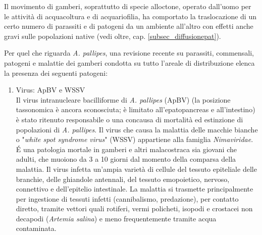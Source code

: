 \documentclass[11pt,a4paper,italian,twoside,openany]{memoir}
\begin{document}
Il movimento di gamberi, soprattutto di specie alloctone, operato dall'uomo per le attività di acquacoltura e di acquariofilia, ha comportato la traslocazione di un certo numero di parassiti e di patogeni da un ambiente all'altro con effetti anche gravi sulle popolazioni native (vedi oltre, cap. \ref{subsec_diffusionepat}).

Per quel che riguarda \emph{A. pallipes}, una revisione recente su parassiti, commensali, patogeni e malattie dei gamberi condotta su tutto l'areale di distribuzione \cite{Longshaw 2016} \cite{Quaglio 2011} elenca la presenza dei seguenti patogeni:
\begin{enumerate}[label={\alph*)}]
  \item Virus: ApBV e WSSV \\
  Il virus intranucleare bacilliforme di \emph{A. pallipes} (ApBV) (la posizione tassonomica è ancora sconosciuta; è limitato all'epatopancreas e all'intestino) è stato ritenuto responsabile o una concausa di mortalità ed estinzione di popolazioni di \emph{A. pallipes}. Il virus che causa la malattia delle macchie bianche o "\emph{white spot syndrome virus}" (WSSV) appartiene alla famiglia \emph{Nimaviridae}. É una patologia mortale in gamberi e altri malacostraca sia giovani che adulti, che muoiono da 3 a 10 giorni dal momento della comparsa della malattia. Il virus infetta un'ampia varietà di cellule del tessuto epiteliale delle branchie, delle ghiandole antennali, del tessuto emopoietico, nervoso, connettivo e dell'epitelio intestinale. La malattia si trasmette principalmente per ingestione di tessuti infetti (cannibalismo, predazione), per contatto diretto, tramite vettori quali rotiferi, vermi policheti, isopodi e crostacei non decapodi (\emph{Artemia salina}) e meno frequentemente tramite acqua contaminata.


\end{enumerate}
\end{document}
